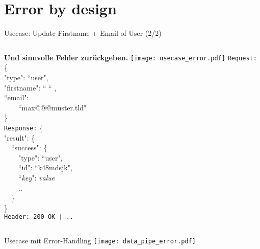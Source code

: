 \documentclass[compress]{beamer}
\begin{document}
\section{Error by design}
\begin{frame}{Usecase: Update Firstname + Email of User (2/2)}
  \begin{columns}[c]
  \textbf{Und sinnvolle Fehler zurückgeben.}
    \texttt{[image: usecase\_error.pdf]}
    {\tt Request:}
    \{\\"type": ``user",\\
      "firstname": `` `` ,\\
      ``email":\\
      ~~~~``max@@@muster.tld"\\
    \}
    \\
    {\tt Response:}
    \{\\
      "result": \{\\
      ~~``success": \{\\~~~~"type": ``user",\\
      ~~~~``id": ``k48mdsjk",\\
      ~~~~``\textit{key}": \textit{value}\\
      ~~~~..\\
      ~~\}\\
    \}
    \\
    \texttt{Header: 200 OK | ..}
  \end{columns}
\end{frame}
\begin{frame}{Usecase mit Error-Handling}
  \texttt{[image: data\_pipe\_error.pdf]}
\end{frame}
\end{document}

